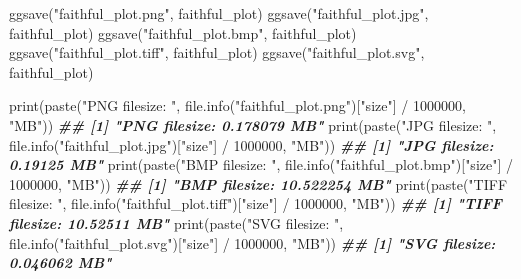 \documentclass[
]{krantz}
\makeatletter
\newenvironment{Shaded}{\begin{snugshade}}{\end{snugshade}}
\newcommand{\DecValTok}[1]{\textcolor[rgb]{0.06,0.06,0.06}{#1}}
\newcommand{\DocumentationTok}[1]{\textcolor[rgb]{0.37,0.37,0.37}{\textbf{\textit{#1}}}}
\newcommand{\FunctionTok}[1]{\textcolor[rgb]{0,0,0}{#1}}
\newcommand{\NormalTok}[1]{#1}
\newcommand{\SpecialCharTok}[1]{\textcolor[rgb]{0,0,0}{#1}}
\newcommand{\StringTok}[1]{\textcolor[rgb]{0.5,0.5,0.5}{#1}}
\newenvironment{kframe}{%
\medskip{}
\setlength{\fboxsep}{.8em}
 \def\at@end@of@kframe{}%
 \ifinner\ifhmode%
  \def\at@end@of@kframe{\end{minipage}}%
  \begin{minipage}{\columnwidth}%
 \fi\fi%
 \def\FrameCommand##1{\hskip\@totalleftmargin \hskip-\fboxsep
 \colorbox{shadecolor}{##1}\hskip-\fboxsep
     \hskip-\linewidth \hskip-\@totalleftmargin \hskip\columnwidth}%
 \MakeFramed {\advance\hsize-\width
   \@totalleftmargin\z@ \linewidth\hsize
   \@setminipage}}%
 {\par\unskip\endMakeFramed%
 \at@end@of@kframe}
\renewenvironment{Shaded}{\begin{kframe}}{\end{kframe}}
\makeatother
\begin{document}
\begin{Shaded}
\begin{Highlighting}[]

\FunctionTok{ggsave}\NormalTok{(}\StringTok{"faithful\_plot.png"}\NormalTok{, faithful\_plot)}
\FunctionTok{ggsave}\NormalTok{(}\StringTok{"faithful\_plot.jpg"}\NormalTok{, faithful\_plot)}
\FunctionTok{ggsave}\NormalTok{(}\StringTok{"faithful\_plot.bmp"}\NormalTok{, faithful\_plot)}
\FunctionTok{ggsave}\NormalTok{(}\StringTok{"faithful\_plot.tiff"}\NormalTok{, faithful\_plot)}
\FunctionTok{ggsave}\NormalTok{(}\StringTok{"faithful\_plot.svg"}\NormalTok{, faithful\_plot)}

\FunctionTok{print}\NormalTok{(}\FunctionTok{paste}\NormalTok{(}\StringTok{"PNG filesize: "}\NormalTok{, }\FunctionTok{file.info}\NormalTok{(}\StringTok{"faithful\_plot.png"}\NormalTok{)[}\StringTok{"size"}\NormalTok{] }\SpecialCharTok{/} \DecValTok{1000000}\NormalTok{, }\StringTok{"MB"}\NormalTok{))}
\DocumentationTok{\#\# [1] "PNG filesize:  0.178079 MB"}
\FunctionTok{print}\NormalTok{(}\FunctionTok{paste}\NormalTok{(}\StringTok{"JPG filesize: "}\NormalTok{, }\FunctionTok{file.info}\NormalTok{(}\StringTok{"faithful\_plot.jpg"}\NormalTok{)[}\StringTok{"size"}\NormalTok{] }\SpecialCharTok{/} \DecValTok{1000000}\NormalTok{, }\StringTok{"MB"}\NormalTok{))}
\DocumentationTok{\#\# [1] "JPG filesize:  0.19125 MB"}
\FunctionTok{print}\NormalTok{(}\FunctionTok{paste}\NormalTok{(}\StringTok{"BMP filesize: "}\NormalTok{, }\FunctionTok{file.info}\NormalTok{(}\StringTok{"faithful\_plot.bmp"}\NormalTok{)[}\StringTok{"size"}\NormalTok{] }\SpecialCharTok{/} \DecValTok{1000000}\NormalTok{, }\StringTok{"MB"}\NormalTok{))}
\DocumentationTok{\#\# [1] "BMP filesize:  10.522254 MB"}
\FunctionTok{print}\NormalTok{(}\FunctionTok{paste}\NormalTok{(}\StringTok{"TIFF filesize: "}\NormalTok{, }\FunctionTok{file.info}\NormalTok{(}\StringTok{"faithful\_plot.tiff"}\NormalTok{)[}\StringTok{"size"}\NormalTok{] }\SpecialCharTok{/} \DecValTok{1000000}\NormalTok{, }\StringTok{"MB"}\NormalTok{))}
\DocumentationTok{\#\# [1] "TIFF filesize:  10.52511 MB"}
\FunctionTok{print}\NormalTok{(}\FunctionTok{paste}\NormalTok{(}\StringTok{"SVG filesize: "}\NormalTok{, }\FunctionTok{file.info}\NormalTok{(}\StringTok{"faithful\_plot.svg"}\NormalTok{)[}\StringTok{"size"}\NormalTok{] }\SpecialCharTok{/} \DecValTok{1000000}\NormalTok{, }\StringTok{"MB"}\NormalTok{))}
\DocumentationTok{\#\# [1] "SVG filesize:  0.046062 MB"}
\end{Highlighting}
\end{Shaded}
\end{document}
